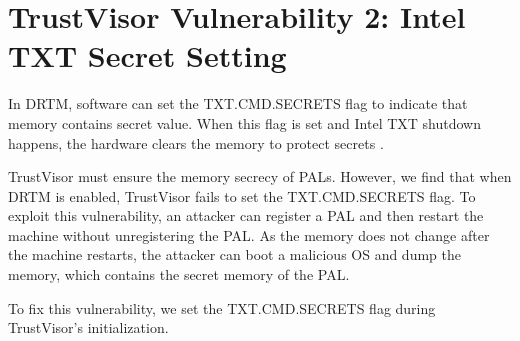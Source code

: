 \section{TrustVisor Vulnerability 2: Intel TXT Secret Setting}
\label{sec:vuln_xmhf_tv_txt_secret}

In DRTM, software can set the TXT.CMD.SECRETS flag to indicate that memory contains secret value. When this flag is set and Intel TXT shutdown happens, the hardware clears the memory to protect secrets \cite{intel_txt}.

TrustVisor must ensure the memory secrecy of PALs. However, we find that when DRTM is enabled, TrustVisor fails to set the TXT.CMD.SECRETS flag. To exploit this vulnerability, an attacker can register a PAL and then restart the machine without unregistering the PAL. As the memory does not change after the machine restarts, the attacker can boot a malicious OS and dump the memory, which contains the secret memory of the PAL.

To fix this vulnerability, we set the TXT.CMD.SECRETS flag during TrustVisor's initialization.

